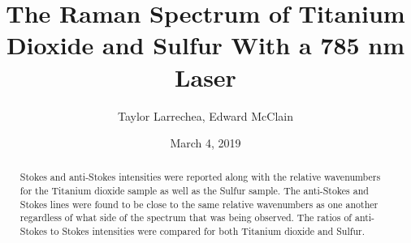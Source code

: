 \documentclass[12pt]{article}
\title{The Raman Spectrum of Titanium Dioxide and Sulfur With a 785 nm Laser}
\author{Taylor Larrechea, Edward McClain}
\affil{Colorado Mesa University}
\affil{Department of Physical and Environmental Sciences}
\date{March 4, 2019}
\begin{document}
\maketitle
\begin{abstract}
\paragraph{}
\setlength{\parskip}{1em}
Stokes and anti-Stokes intensities were reported along with the relative wavenumbers for the Titanium dioxide sample as well as the Sulfur sample. The anti-Stokes and Stokes lines were found to be close to the same relative wavenumbers as one another regardless of what side of the spectrum that was being observed. The ratios of anti-Stokes to Stokes intensities were compared for both Titanium dioxide and Sulfur.
\end{abstract}
\end{document}

